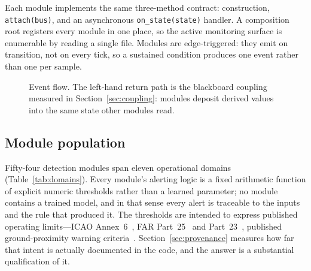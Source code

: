 \documentclass[conference]{IEEEtran}
\begin{document}
Each module implements the same three-method contract: construction,
\texttt{attach(bus)}, and an asynchronous \texttt{on\_state(state)} handler. A
composition root registers every module in one place, so the active monitoring
surface is enumerable by reading a single file. Modules are edge-triggered:
they emit on transition, not on every tick, so a sustained condition produces
one event rather than one per sample.

\begin{figure}[t]
\centering
{}
\caption{Event flow. The left-hand return path is the blackboard coupling
measured in Section~\ref{sec:coupling}: modules deposit derived values into
the same state other modules read.}
\label{fig:flow}
\end{figure}

\subsection{Module population}

Fifty-four detection modules span eleven operational domains
(Table~\ref{tab:domains}). Every module's alerting logic is a fixed arithmetic
function of explicit numeric thresholds rather than a learned parameter; no
module contains a trained model, and in that sense every alert is traceable to
the inputs and the rule that produced it. The thresholds are intended to
express published operating limits---ICAO Annex~6~\cite{icao_annex6}, FAR
Part~25~\cite{far25} and Part~23~\cite{far23}, published ground-proximity
warning criteria~\cite{gpws_criteria}. Section~\ref{sec:provenance} measures
how far that intent is actually documented in the code, and the answer is a
substantial qualification of it.
\end{document}
